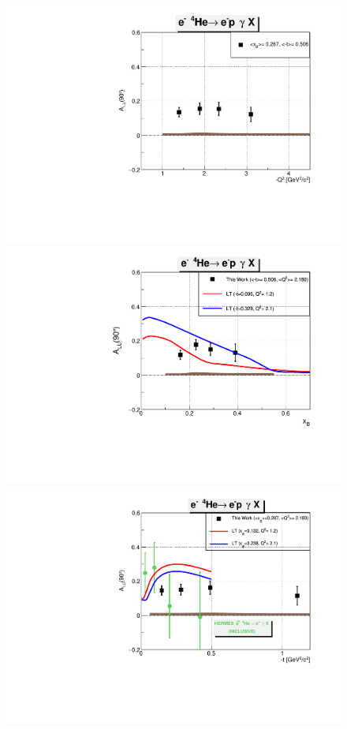 \begin{figure}[tpb]
\includegraphics[scale=0.37]{fig_updated/f_incoh_alu_Q2_90.pdf} 
\includegraphics[scale=0.37]{fig_updated/f_incoh_alu_xB_90.pdf}
\includegraphics[scale=0.37]{fig_updated/f_incoh_alu_t_90.pdf} 

\end{figure}
